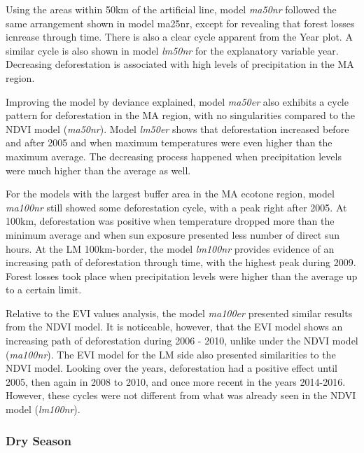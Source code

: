 Using the areas within 50km of the artificial line, model \textit{ma50nr} followed the same arrangement shown in model ma25nr, except for revealing that forest losses icnrease through time. There is also a clear cycle apparent from the Year plot. A similar cycle is also shown in model \textit{lm50nr} for the explanatory variable year. Decreasing deforestation is associated with high levels of precipitation in the MA region. 

Improving the model by deviance explained, model \textit{ma50er} also exhibits a cycle pattern for deforestation in the MA region, with no singularities compared to the NDVI model (\textit{ma50nr}). Model \textit{lm50er} shows that deforestation increased before and after 2005 and when maximum temperatures were even higher than the maximum average. The decreasing process happened when precipitation levels were much higher than the average as well. 

For the models with the largest buffer area in the MA ecotone region, model \textit{ma100nr} still showed some deforestation cycle, with a peak right after 2005. At 100km, deforestation was positive when temperature dropped more than the minimum average and when sun exposure presented less number of direct sun hours. At the LM 100km-border, the model \textit{lm100nr} provides evidence of an increasing path of deforestation through time, with the highest peak during 2009. Forest losses took place when precipitation levels were higher than the average up to a certain limit. 

Relative to the EVI values analysis, the model \textit{ma100er} presented similar results from the NDVI model. It is noticeable, however, that the EVI model shows an increasing path of deforestation during 2006 - 2010, unlike under the NDVI model (\textit{ma100nr}). The EVI model for the LM side also presented similarities to the NDVI model. Looking over the years, deforestation had a positive effect until 2005, then again in 2008 to 2010, and once more recent in the years 2014-2016. However, these cycles were not different from what was already seen in the NDVI model (\textit{lm100nr}).


\subsubsection{Dry Season}

